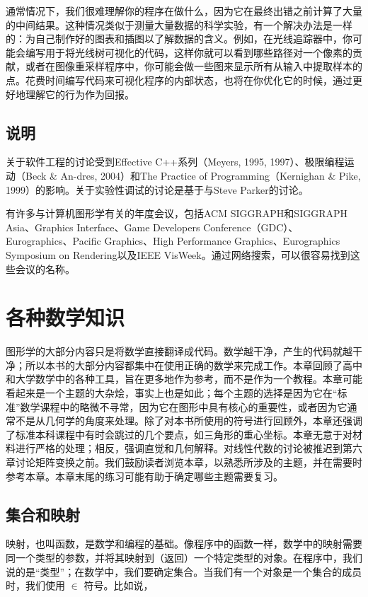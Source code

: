 \documentclass[lang=cn,12pt]{elegantbook}
\begin{document}
通常情况下，我们很难理解你的程序在做什么，因为它在最终出错之前计算了大量的中间结果。这种情况类似于测量大量数据的科学实验，有一个解决办法是一样的：为自己制作好的图表和插图以了解数据的含义。例如，在光线追踪器中，你可能会编写用于将光线树可视化的代码，这样你就可以看到哪些路径对一个像素的贡献，或者在图像重采样程序中，你可能会做一些图来显示所有从输入中提取样本的点。花费时间编写代码来可视化程序的内部状态，也将在你优化它的时候，通过更好地理解它的行为作为回报。


\section*{说明}
关于软件工程的讨论受到Effective C++系列（Meyers, 1995, 1997）、极限编程运动（Beck \& An-dres, 2004）和The Practice of Programming（Kernighan \& Pike, 1999）的影响。关于实验性调试的讨论是基于与Steve Parker的讨论。

有许多与计算机图形学有关的年度会议，包括ACM SIGGRAPH和SIGGRAPH Asia、Graphics Interface、Game Developers Conference（GDC）、Eurographics、Pacific Graphics、High Performance Graphics、Eurographics Symposium on Rendering以及IEEE VisWeek。通过网络搜索，可以很容易找到这些会议的名称。

\chapter{各种数学知识}

图形学的大部分内容只是将数学直接翻译成代码。数学越干净，产生的代码就越干净；所以本书的大部分内容都集中在使用正确的数学来完成工作。本章回顾了高中和大学数学中的各种工具，旨在更多地作为参考，而不是作为一个教程。本章可能看起来是一个主题的大杂烩，事实上也是如此；每个主题的选择是因为它在“标准”数学课程中的略微不寻常，因为它在图形中具有核心的重要性，或者因为它通常不是从几何学的角度来处理。除了对本书所使用的符号进行回顾外，本章还强调了标准本科课程中有时会跳过的几个要点，如三角形的重心坐标。本章无意于对材料进行严格的处理；相反，强调直觉和几何解释。对线性代数的讨论被推迟到第六章讨论矩阵变换之前。我们鼓励读者浏览本章，以熟悉所涉及的主题，并在需要时参考本章。本章末尾的练习可能有助于确定哪些主题需要复习。

\section{集合和映射}

映射，也叫函数，是数学和编程的基础。像程序中的函数一样，数学中的映射需要同一个类型的参数，并将其映射到（返回）一个特定类型的对象。在程序中，我们说的是“类型”；在数学中，我们要确定集合。当我们有一个对象是一个集合的成员时，我们使用 $\in$ 符号。比如说，
\end{document}

